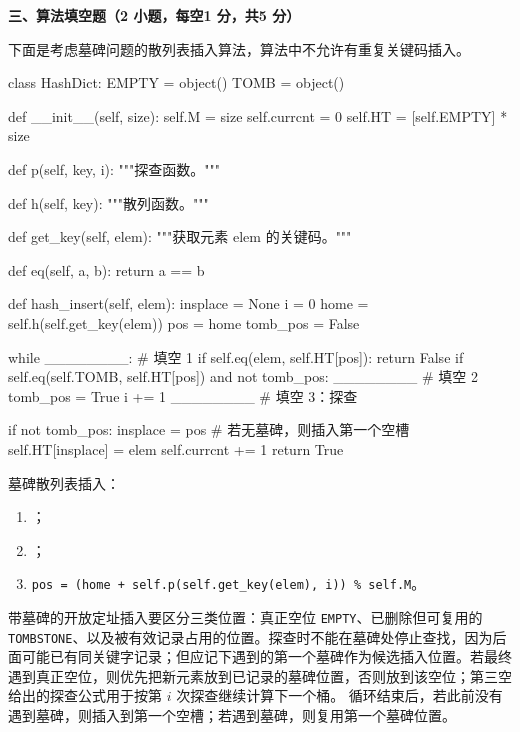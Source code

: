 \textbf{三、算法填空题（2 小题，每空1 分，共5 分）}
\begin{question}
下面是考虑墓碑问题的散列表插入算法，算法中不允许有重复关键码插入。\\
\begin{pycode}
class HashDict:
    EMPTY = object()
    TOMB = object()

    def __init__(self, size):
        self.M = size
        self.currcnt = 0
        self.HT = [self.EMPTY] * size

    def p(self, key, i):
        """探查函数。"""

    def h(self, key):
        """散列函数。"""

    def get_key(self, elem):
        """获取元素 elem 的关键码。"""

    def eq(self, a, b):
        return a == b

    def hash_insert(self, elem):
        insplace = None
        i = 0
        home = self.h(self.get_key(elem))
        pos = home
        tomb_pos = False

        while ________:                 # 填空 1
            if self.eq(elem, self.HT[pos]):
                return False
            if self.eq(self.TOMB, self.HT[pos]) and not tomb_pos:
                ________                # 填空 2
                tomb_pos = True
            i += 1
            ________                    # 填空 3：探查

        if not tomb_pos:
            insplace = pos              # 若无墓碑，则插入第一个空槽
        self.HT[insplace] = elem
        self.currcnt += 1
        return True
\end{pycode}
\begin{solution}
墓碑散列表插入：
  \begin{enumerate}[leftmargin=2em]
    \item \texttt{}；
    \item \texttt{}；
    \item \texttt{pos = (home + self.p(self.get\_key(elem), i)) \% self.M}。
  \end{enumerate}
带墓碑的开放定址插入要区分三类位置：真正空位 \texttt{EMPTY}、已删除但可复用的 \texttt{TOMBSTONE}、以及被有效记录占用的位置。探查时不能在墓碑处停止查找，因为后面可能已有同关键字记录；但应记下遇到的第一个墓碑作为候选插入位置。若最终遇到真正空位，则优先把新元素放到已记录的墓碑位置，否则放到该空位；第三空给出的探查公式用于按第 $i$ 次探查继续计算下一个桶。
  循环结束后，若此前没有遇到墓碑，则插入到第一个空槽；若遇到墓碑，则复用第一个墓碑位置。
\end{solution}
\end{question}

